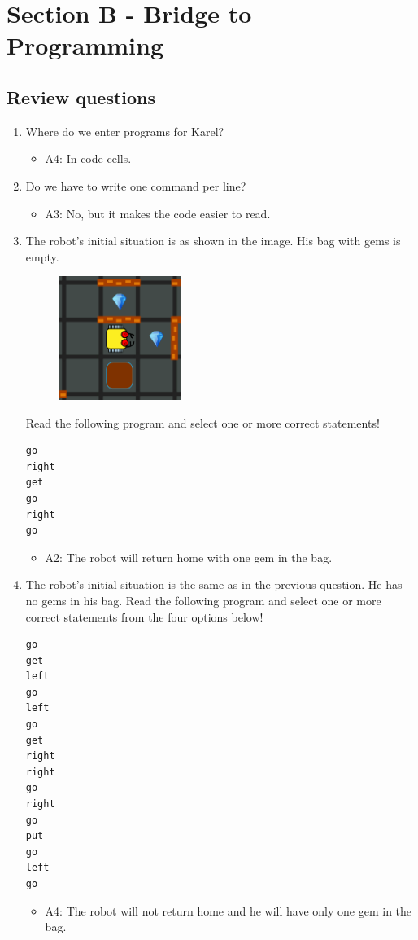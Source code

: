 \documentclass[article,A4,12pt]{llncs}
\begin{document}
\section{Section B - Bridge to Programming}

\subsection{Review questions}

\begin{enumerate}
\item Where do we enter programs for Karel?
  \begin{itemize}
    \item A4: In code cells.
  \end{itemize}
\item Do we have to write one command per line?
  \begin{itemize}
    \item A3: No, but it makes the code easier to read.
  \end{itemize}
\item The robot's initial situation is as shown in the image. His bag with gems is empty. 
\begin{figure}[!ht]
\begin{center}
\includegraphics[width=4cm]{imgk/maze-0.png}
\end{center}
\end{figure}
\noindent
      Read the following program and select one or more correct statements!
\begin{verbatim}
go
right
get
go
right 
go
\end{verbatim}
  \begin{itemize}
    \item A2: The robot will return home with one gem in the bag.
  \end{itemize}
\item The robot's initial situation is the same as in the previous question. He has no gems 
in his bag. Read the following program and select one or more correct statements from the four options below!
\begin{verbatim}
go
get
left
go
left
go
get
right
right
go
right
go
put
go
left 
go
\end{verbatim}
  \begin{itemize}
    \item A4: The robot will not return home and he will have only one gem in the bag.
  \end{itemize}
\end{enumerate}
\end{document}
